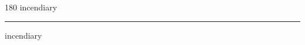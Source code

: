 
\begin{frame}
\begin{center}
\begin{turn}{180}
{\fontsize{2.5cm}{1em}\selectfont incendiary}
\end{turn}
\vspace{1em}\par  
\hrule
\vspace{1em}\par  
{\fontsize{2.5cm}{1em}\selectfont incendiary}
\end{center}
\end{frame}

